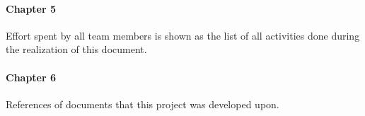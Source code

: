 \documentclass[../rasd.tex]{subfiles}
\begin{document}
		\paragraph{Chapter 5}
		Effort spent by all team members is shown as the list of all activities done during the realization of this document.
		\paragraph{Chapter 6}
		References of documents that this project was developed upon.
		
\end{document}
